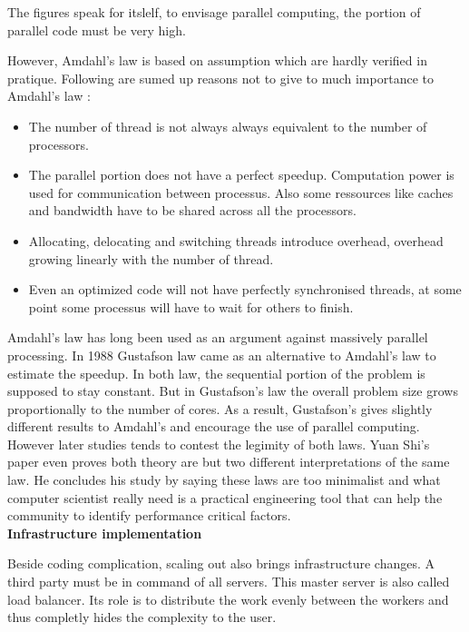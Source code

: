 The figures speak for itslelf, to envisage parallel computing, the portion of
parallel code must be very high.

However, Amdahl's law is based on assumption which are hardly verified in
pratique. Following are sumed up reasons not to give to much importance to
Amdahl's law \citep{Reference34}:

\begin{itemize} 
  \item The number of thread is not always always equivalent to the number of processors.  
  \item The parallel portion does not have a perfect speedup. Computation power is used
    for communication between processus. Also some ressources like caches and bandwidth
    have to be shared across all the processors.  
  \item Allocating, delocating and switching threads introduce overhead, overhead growing
    linearly with the number of thread.  
  \item Even an optimized code will not have perfectly synchronised threads, at some point
    some processus will have to wait for others to finish.	
\end{itemize}


Amdahl's law has long been used as an argument against massively parallel
processing. In 1988 Gustafson law came as an alternative to Amdahl's law to
estimate the speedup. In both law, the sequential portion of the problem is
supposed to stay constant. But in Gustafson's law the overall problem size
grows proportionally to the number of cores. As a result, Gustafson's gives
slightly different results to Amdahl's and encourage the use of parallel
computing.\\

However later studies tends to contest the legimity of both laws. Yuan Shi's
paper \citep{Reference9} even proves both theory are but two different
interpretations of the same law. He concludes his study by saying these laws
are too minimalist and what computer scientist really need is a practical
engineering tool that can help the community to identify performance critical
factors.\\

\textbf{Infrastructure implementation}

Beside coding complication, scaling out also brings infrastructure changes.
A third party must be in command of all servers. This master server is also called
load balancer. Its role is to distribute the work evenly between the workers and thus
completly hides the complexity to the user.\\


